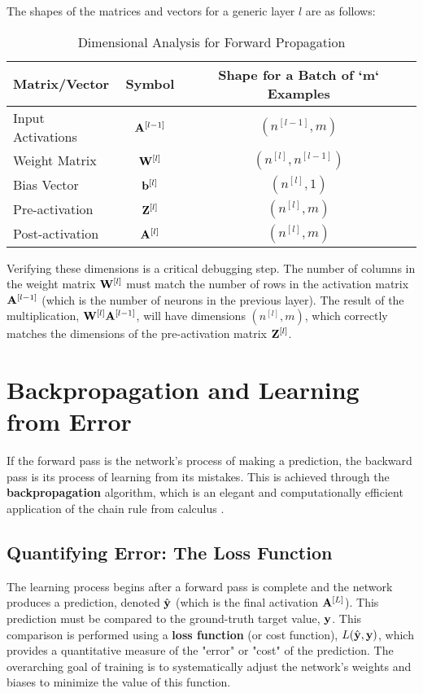 The shapes of the matrices and vectors for a generic layer $l$ are as follows:
\begin{table}[h!]
\centering
\caption{Dimensional Analysis for Forward Propagation}
\label{tab:forward_dims}
\begin{tabular}{@{}lcc@{}}
\toprule
\textbf{Matrix/Vector} & \multicolumn{1}{c}{\textbf{Symbol}} & \multicolumn{1}{c}{\textbf{Shape for a Batch of `m` Examples}} \\ \midrule
Input Activations & $\mathbf{A}^{[l-1]}$ & $(n^{[l-1]}, m)$ \\
Weight Matrix & $\mathbf{W}^{[l]}$ & $(n^{[l]}, n^{[l-1]})$ \\
Bias Vector & $\mathbf{b}^{[l]}$ & $(n^{[l]}, 1)$ \\
Pre-activation & $\mathbf{Z}^{[l]}$ & $(n^{[l]}, m)$ \\
Post-activation & $\mathbf{A}^{[l]}$ & $(n^{[l]}, m)$ \\ \bottomrule
\end{tabular}
\end{table}
Verifying these dimensions is a critical debugging step. The number of columns in the weight matrix $\mathbf{W}^{[l]}$ must match the number of rows in the activation matrix $\mathbf{A}^{[l-1]}$ (which is the number of neurons in the previous layer). The result of the multiplication, $\mathbf{W}^{[l]}\mathbf{A}^{[l-1]}$, will have dimensions $(n^{[l]}, m)$, which correctly matches the dimensions of the pre-activation matrix $\mathbf{Z}^{[l]}$.

\section{Backpropagation and Learning from Error}
\label{sec:backprop}

If the forward pass is the network's process of making a prediction, the backward pass is its process of learning from its mistakes. This is achieved through the \textbf{backpropagation} algorithm, which is an elegant and computationally efficient application of the chain rule from calculus \cite{Rumelhart1986Backprop}.

\subsection{Quantifying Error: The Loss Function}
The learning process begins after a forward pass is complete and the network produces a prediction, denoted $\hat{\mathbf{y}}$ (which is the final activation $\mathbf{A}^{[L]}$). This prediction must be compared to the ground-truth target value, $\mathbf{y}$. This comparison is performed using a \textbf{loss function} (or cost function), $L(\hat{\mathbf{y}}, \mathbf{y})$, which provides a quantitative measure of the "error" or "cost" of the prediction. The overarching goal of training is to systematically adjust the network's weights and biases to minimize the value of this function.

